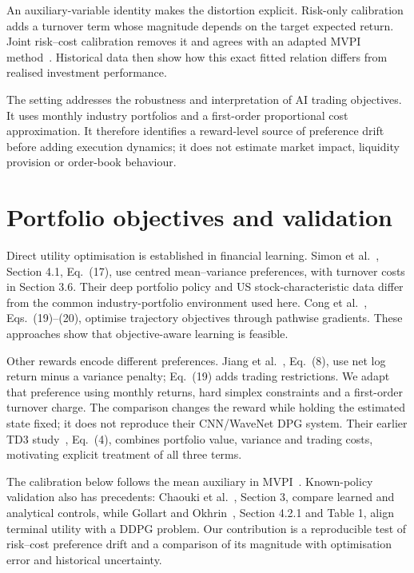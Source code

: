 \documentclass[sigconf,review]{acmart}
\begin{document}
An auxiliary-variable identity makes the distortion explicit. Risk-only calibration adds a turnover term whose magnitude depends on the target expected return. Joint risk--cost calibration removes it and agrees with an adapted MVPI method\ \cite{zhang2021}. Historical data then show how this exact fitted relation differs from realised investment performance.

The setting addresses the robustness and interpretation of AI trading objectives. It uses monthly industry portfolios and a first-order proportional cost approximation. It therefore identifies a reward-level source of preference drift before adding execution dynamics; it does not estimate market impact, liquidity provision or order-book behaviour.

\section{Portfolio objectives and validation}
Direct utility optimisation is established in financial learning. Simon et al.\ \cite{simon2026}, Section 4.1, Eq.\ (17), use centred mean--variance preferences, with turnover costs in Section 3.6. Their deep portfolio policy and US stock-characteristic data differ from the common industry-portfolio environment used here. Cong et al.\ \cite{cong2026}, Eqs.\ (19)--(20), optimise trajectory objectives through pathwise gradients. These approaches show that objective-aware learning is feasible.

Other rewards encode different preferences. Jiang et al.\ \cite{jiang2025}, Eq.\ (8), use net log return minus a variance penalty; Eq.\ (19) adds trading restrictions. We adapt that preference using monthly returns, hard simplex constraints and a first-order turnover charge. The comparison changes the reward while holding the estimated state fixed; it does not reproduce their CNN/WaveNet DPG system. Their earlier TD3 study\ \cite{jiang2024}, Eq.\ (4), combines portfolio value, variance and trading costs, motivating explicit treatment of all three terms.

The calibration below follows the mean auxiliary in MVPI\ \cite{zhang2021}. Known-policy validation also has precedents: Chaouki et al.\ \cite{chaouki2020}, Section 3, compare learned and analytical controls, while Gollart and Okhrin\ \cite{gollart2025}, Section 4.2.1 and Table 1, align terminal utility with a DDPG problem. Our contribution is a reproducible test of risk--cost preference drift and a comparison of its magnitude with optimisation error and historical uncertainty.
\end{document}
